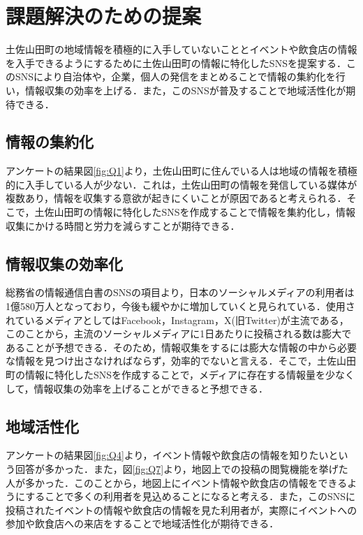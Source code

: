 \section{課題解決のための提案}
土佐山田町の地域情報を積極的に入手していないこととイベントや飲食店の情報を入手できるようにするために土佐山田町の情報に特化したSNSを提案する．このSNSにより自治体や，企業，個人の発信をまとめることで情報の集約化を行い，情報収集の効率を上げる．また，このSNSが普及することで地域活性化が期待できる．

\subsection{情報の集約化}
アンケートの結果図\ref{fig:Q1}より，土佐山田町に住んでいる人は地域の情報を積極的に入手している人が少ない．これは，土佐山田町の情報を発信している媒体が複数あり，情報を収集する意欲が起きにくいことが原因であると考えられる．そこで，土佐山田町の情報に特化したSNSを作成することで情報を集約化し，情報収集にかける時間と労力を減らすことが期待できる．

\subsection{情報収集の効率化}
総務省の情報通信白書\cite{label3}のSNSの項目より，日本のソーシャルメディアの利用者は1億580万人となっており，今後も緩やかに増加していくと見られている．使用されているメディアとしてはFacebook，Instagram，X(旧Twitter)が主流である，このことから，主流のソーシャルメディアに1日あたりに投稿される数は膨大であることが予想できる．そのため，情報収集をするには膨大な情報の中から必要な情報を見つけ出さなければならず，効率的でないと言える．そこで，土佐山田町の情報に特化したSNSを作成することで，メディアに存在する情報量を少なくして，情報収集の効率を上げることができると予想できる．

\subsection{地域活性化}
アンケートの結果図\ref{fig:Q4}より，イベント情報や飲食店の情報を知りたいという回答が多かった．また，図\ref{fig:Q7}より，地図上での投稿の閲覧機能を挙げた人が多かった．このことから，地図上にイベント情報や飲食店の情報をできるようにすることで多くの利用者を見込めることになると考える．また，このSNSに投稿されたイベントの情報や飲食店の情報を見た利用者が，実際にイベントへの参加や飲食店への来店をすることで地域活性化が期待できる．